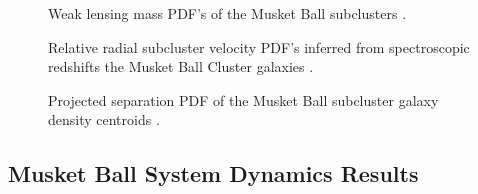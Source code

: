 \begin{figure}
\caption{Weak lensing mass PDF's of the Musket Ball subclusters \citep{Dawson:2012dl}. 
\label{musket_massinput}}
\end{figure}

\begin{figure}
\caption{Relative radial subcluster velocity PDF's inferred from spectroscopic redshifts the Musket Ball Cluster galaxies  \citep{Dawson:2012dl}. 
\label{musket_vinput}}
\end{figure}

\begin{figure}
\caption{Projected separation PDF of the Musket Ball subcluster galaxy density centroids \citep{Dawson:2012dl}. 
\label{musket_projinput}}
\end{figure}

\subsection{Musket Ball System Dynamics Results}

